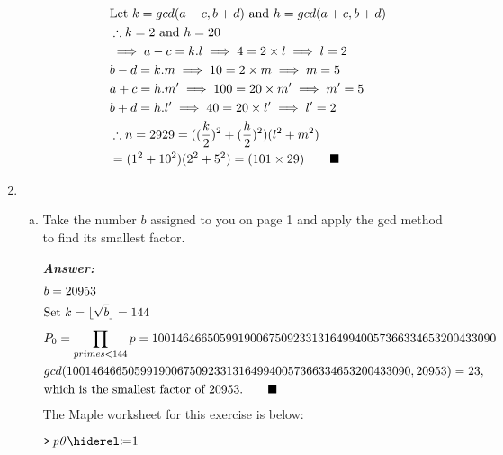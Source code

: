 \documentclass[11pt,a4paper,fleqn]{article}
\newcommand{\qedn}{\tag*{$\blacksquare$}}
\begin{document}
\begin{enumerate}[1.]
\begin{enumerate}[a.]
\begin{flushleft}
\begin{align*}
               \end{align*}
               \begin{align*}
                    &\text{Let } k = gcd(a - c, b + d) \text{ and } h = gcd(a + c, b + d)\\
                    &\therefore k = 2 \text{ and } h = 20\\
                    &\implies a - c =  k.l \implies 4 = 2 \times l \implies l = 2\\
                    &b - d = k.m \implies 10 = 2 \times m \implies m = 5\\
                    &a + c = h.m' \implies 100 = 20 \times m' \implies m' = 5\\
                    &b + d = h.l' \implies 40 = 20 \times l' \implies l' = 2\\
                    &\therefore n = 2929 = ((\frac{k}{2})^2 + (\frac{h}{2})^2)(l^2 + m^2)\\
                    & = (1^2 + 10^2)(2^2 + 5^2) = (101 \times 29)
                    \hfill\qedn
                \end{align*}
			\end{flushleft}
		\end{enumerate}
		\item
		\begin{enumerate}[(a)]
			\item Take the number $b$ assigned to you on page 1 and apply the gcd method to find its smallest factor.
			\begin{flushleft}
				\textbf{\textit{Answer:}}
                \begin{align*}
                    & b = 20953\\
                    &\text{Set } k = \lfloor\sqrt{b}\rfloor = 144\\
                    &P_0 = \prod_{primes < 144}^{}p = 10014646650599190067509233131649940057366334653200433090\\
                    &gcd(10014646650599190067509233131649940057366334653200433090, 20953) = 23, \\
                    &\text{which is the smallest factor of 20953}.
                    \hfill\qedn
                \end{align*}
                \bigbreak
                The Maple worksheet for this exercise is below:
                \begin{mdframed}
                    \mapleinput
                    {$ \displaystyle \texttt{>\,} \mathit{p0} \coloneqq 1 $}


\end{mdframed}
\end{flushleft}
\end{enumerate}
\end{enumerate}
\end{document}
